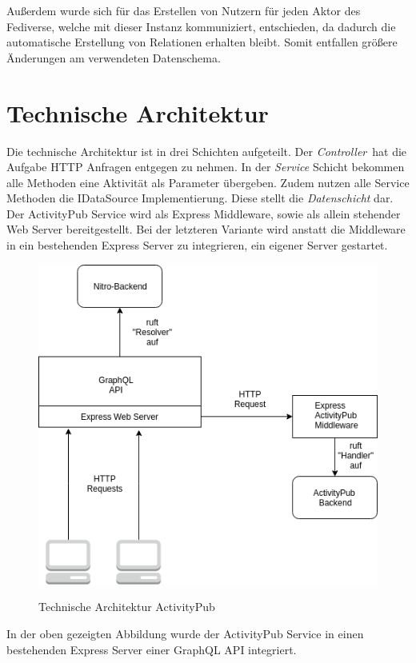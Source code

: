 	Außerdem wurde sich für das Erstellen von Nutzern für jeden Aktor des Fediverse, welche mit dieser Instanz kommuniziert, entschieden, da dadurch die automatische Erstellung von Relationen erhalten bleibt. Somit entfallen größere Änderungen am verwendeten Datenschema.
	\pagebreak
\section{Technische Architektur}
	Die technische Architektur ist in drei Schichten aufgeteilt. Der \textit{ Controller}~hat die Aufgabe HTTP Anfragen entgegen zu nehmen. In der \textit{Service} Schicht bekommen alle Methoden eine Aktivität als Parameter übergeben. Zudem nutzen alle Service Methoden die IDataSource Implementierung. Diese stellt die \textit{Datenschicht} dar.\\
	
	Der ActivityPub Service wird als Express Middleware, sowie als allein stehender Web Server bereitgestellt. Bei der letzteren Variante wird anstatt die Middleware in ein bestehenden Express Server zu integrieren, ein eigener  Server gestartet.\\
	\begin{figure}[H]
		\centering
		\includegraphics[scale=0.6]{figures/technische-architektur-activitypub.png}
		\label{fig:tech-arch}
		\caption{Technische Architektur ActivityPub}
	\end{figure}
	In der oben gezeigten Abbildung wurde der ActivityPub Service in einen bestehenden Express Server einer GraphQL API integriert.\\
	
